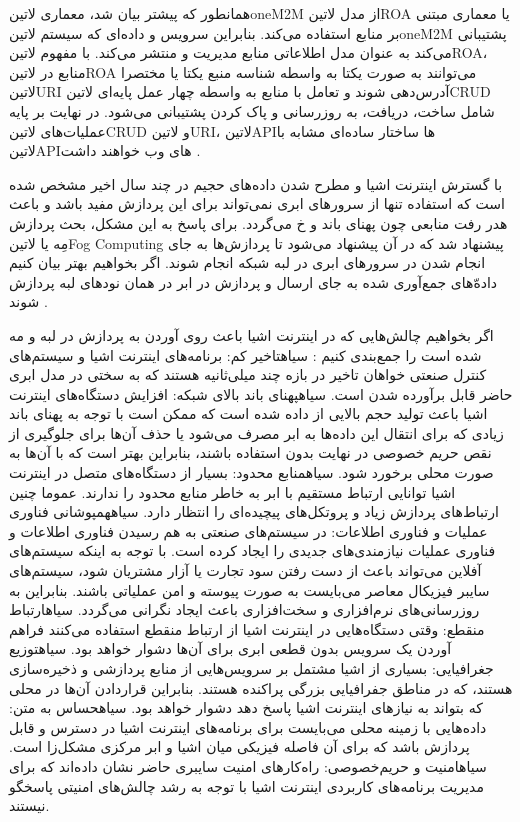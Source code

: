 همانطور که پیشتر بیان شد، معماری ‌لاتین{oneM2M} از مدل ‌لاتین{ROA} یا معماری مبتنی بر منابع استفاده می‌کند.
بنابراین سرویس و داده‌ای که سیستم ‌لاتین{oneM2M} پشتیبانی می‌کند به عنوان مدل اطلاعاتی منابع مدیریت و منتشر می‌کند.
با مفهوم ‌لاتین{ROA}، منابع در ‌لاتین{ROA} می‌توانند به صورت یکتا به واسطه شناسه منبع یکتا یا مختصرا ‌لاتین{URI}
آدرس‌دهی شوند و تعامل با منابع به واسطه چهار عمل پایه‌ای ‌لاتین{CRUD} شامل ساخت، دریافت، به روزرسانی و پاک کردن پشتیبانی می‌شود.
در نهایت بر پایه عملیات‌های ‌لاتین{CRUD} و ‌لاتین{URI}، ‌لاتین{API}ها ساختار ساده‌ای مشابه با ‌لاتین{API}های وب خواهند داشت
.


با گسترش اینترنت اشیا و مطرح شدن داده‌های حجیم در چند سال اخیر مشخص شده است که استفاده تنها از سرورهای ابری نمی‌تواند برای این پردازش مفید باشد و باعث هدر رفت منابعی چون پهنای باند و ‌خ می‌گردد.
برای پاسخ به این مشکل، بحث پردازش مِه یا ‌لاتین{Fog Computing} پیشنهاد شد که در آن پیشنهاد می‌شود تا پردازش‌ها به جای انجام شدن در سرورهای ابری در لبه شبکه انجام شوند.
اگر بخواهیم بهتر بیان کنیم داده‌ّهای جمع‌آوری شده به جای ارسال و پردازش در ابر در همان نودهای لبه پردازش شوند
.

اگر بخواهیم چالش‌هایی که در اینترنت اشیا باعث روی آوردن به پردازش در لبه و مه شده است را جمع‌بندی کنیم
:
 ‌سیاه{تاخیر کم}: برنامه‌های اینترنت اشیا و سیستم‌های کنترل صنعتی خواهان تاخیر در بازه چند میلی‌ثانیه هستند که به سختی در مدل ابری حاضر قابل برآورده شدن است.
 ‌سیاه{پهنای باند بالای شبکه}: افزایش دستگاه‌های اینترنت اشیا باعث تولید حجم بالایی از داده شده است که ممکن است با توجه به پهنای باند زیادی که برای
انتقال این داده‌ها به ابر مصرف می‌شود یا حذف آن‌ها برای جلوگیری از نقص حریم خصوصی در نهایت
بدون استفاده باشند، بنابراین بهتر است که با آن‌ها به صورت محلی برخورد شود.
 ‌سیاه{منابع محدود}: بسیار از دستگاه‌های متصل در اینترنت اشیا توانایی ارتباط مستقیم با ابر به خاطر منابع محدود را ندارند. عموما چنین ارتباط‌های پردازش زیاد و پروتکل‌های پیچیده‌ای را انتظار دارد.
 ‌سیاه{همپوشانی فناوری عملیات و فناوری اطلاعات}: در سیستم‌های صنعتی به هم رسیدن فناوری اطلاعات و فناوری عملیات نیازمندی‌های جدیدی را ایجاد کرده است. با توجه به اینکه سیستم‌های آفلاین
می‌تواند باعث از دست رفتن سود تجارت یا آزار مشتریان شود، سیستم‌های سایبر فیزیکال معاصر می‌بایست به صورت پیوسته و امن عملیاتی باشند. بنابراین به روزرسانی‌های نرم‌افزاری و سخت‌افزاری باعث ایجاد نگرانی می‌گردد.
 ‌سیاه{ارتباط منقطع}: وقتی دستگاه‌هایی در اینترنت اشیا از ارتباط منقطع استفاده می‌کنند فراهم آوردن یک سرویس بدون قطعی ابری برای آن‌ها دشوار خواهد بود.
 ‌سیاه{توزیع جغرافیایی}: بسیاری از اشیا مشتمل بر سرویس‌هایی از منابع پردازشی و ذخیره‌سازی هستند، که در مناطق جفرافیایی بزرگی پراکنده هستند. بنابراین قراردادن آن‌ها در محلی که بتواند به نیازهای اینترنت اشیا پاسخ دهد
دشوار خواهد بود.
 ‌سیاه{حساس به متن}: داده‌هایی با زمینه محلی می‌بایست برای برنامه‌های اینترنت اشیا در دسترس و قابل پردازش باشد که برای آن فاصله فیزیکی میان اشیا و ابر مرکزی مشکل‌زا است.
 ‌سیاه{امنیت و حریم‌خصوصی}: راه‌کارهای امنیت سایبری حاضر نشان داده‌اند که برای مدیریت برنامه‌های کاربردی اینترنت اشیا با توجه به رشد چالش‌های امنیتی پاسخگو نیستند.

